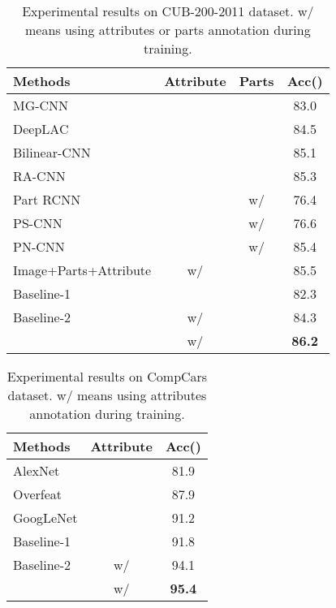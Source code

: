 \documentclass[sigconf]{acmart}
\begin{document}
\begin{table}[!htp]
\renewcommand\arraystretch{1.0}
\centering
\caption{Experimental results on CUB-200-2011 dataset. w/ means using attributes or parts annotation during training.}
\label{table:cub}
\begin{tabular}{l|c|c|c}
\Xhline{1.0pt}
Methods                   & Attribute    & Parts    & Acc()             \\ \hline
MG-CNN \cite{wang2015multiple}    &    &     &  83.0            \\
DeepLAC \cite{zhang2016picking}    &    &     &  84.5            \\
Bilinear-CNN \cite{lin2015bilinear}               &    &     &  85.1             \\
RA-CNN \cite{fu2017look} &     &  & 85.3 \\
Part RCNN \cite{zhang2014part}   &       &  w/    & 76.4 \\
PS-CNN \cite{huang2016part}  &     & w/       & 76.6 \\
PN-CNN \cite{branson2014bird} & &  w/ & 85.4 \\
Image+Parts+Attribute \cite{liu2017localizing}      &   w/     &     & 85.5            \\ \hline
Baseline-1         &     &    & 82.3             \\
Baseline-2       & w/    &    & 84.3             \\
      & w/   &    &  \textbf{86.2}             \\ \hline
\end{tabular}
\end{table}

\begin{table}[!htp]
\renewcommand\arraystretch{1.0}
\centering
\caption{Experimental results on CompCars dataset. w/ means using attributes annotation during training.}
\label{table:car}
\begin{tabular}{l|c|c}
\Xhline{1.0pt}
Methods                   & Attribute        & Acc()             \\ \hline
AlexNet  \cite{yang2015large}               &        & 81.9             \\
Overfeat \cite{yang2015large}              &     & 87.9             \\ 
GoogLeNet \cite{yang2015large}              &     & 91.2           \\ \hline
Baseline-1               &         &  91.8             \\
Baseline-2               & w/        & 94.1             \\
              & w/       & \textbf{95.4}           \\ \hline
\end{tabular}
\end{table}
\end{document}
